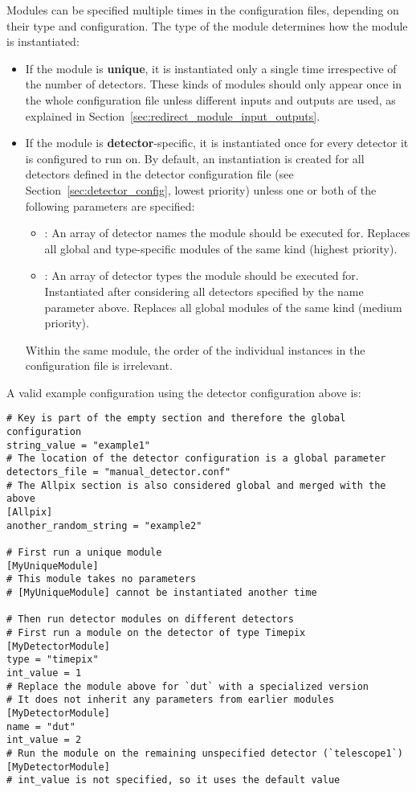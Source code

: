 Modules can be specified multiple times in the configuration files, depending on their type and configuration.
The type of the module determines how the module is instantiated:
\begin{itemize}
\item If the module is \textbf{unique}, it is instantiated only a single time irrespective of the number of detectors.
These kinds of modules should only appear once in the whole configuration file unless different inputs and outputs are used, as explained in Section~\ref{sec:redirect_module_input_outputs}.
\item If the module is \textbf{detector}-specific, it is instantiated once for every detector it is configured to run on.
By default, an instantiation is created for all detectors defined in the detector configuration file (see Section~\ref{sec:detector_config}, lowest priority) unless one or both of the following parameters are specified:
\begin{itemize}
\item {}: An array of detector names the module should be executed for.
Replaces all global and type-specific modules of the same kind (highest priority).
\item {}: An array of detector types the module should be executed for.
Instantiated after considering all detectors specified by the name parameter above.
Replaces all global modules of the same kind (medium priority).
\end{itemize}
Within the same module, the order of the individual instances in the configuration file is irrelevant.
\end{itemize}

A valid example configuration using the detector configuration above is:
\begin{verbatim}
# Key is part of the empty section and therefore the global configuration
string_value = "example1"
# The location of the detector configuration is a global parameter
detectors_file = "manual_detector.conf"
# The Allpix section is also considered global and merged with the above
[Allpix]
another_random_string = "example2"

# First run a unique module
[MyUniqueModule]
# This module takes no parameters
# [MyUniqueModule] cannot be instantiated another time

# Then run detector modules on different detectors
# First run a module on the detector of type Timepix
[MyDetectorModule]
type = "timepix"
int_value = 1
# Replace the module above for `dut` with a specialized version
# It does not inherit any parameters from earlier modules
[MyDetectorModule]
name = "dut"
int_value = 2
# Run the module on the remaining unspecified detector (`telescope1`)
[MyDetectorModule]
# int_value is not specified, so it uses the default value
\end{verbatim}

